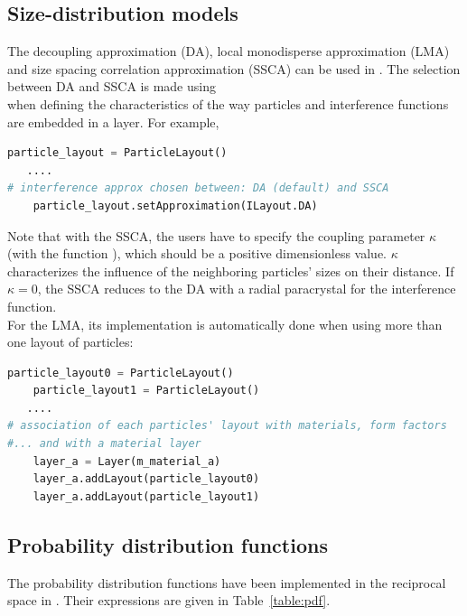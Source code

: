 \subsection{Size-distribution models}
The decoupling approximation (DA), local monodisperse approximation (LMA) and size spacing correlation approximation (SSCA) can be used in \BornAgain.
The selection between DA and SSCA is made using\\ 
 when defining the characteristics of the way particles and interference functions are embedded in a layer.  For example,
\begin{lstlisting}[language=python, style=eclipseboxed,numbers=none,nolol]
    particle_layout = ParticleLayout()
   ....
# interference approx chosen between: DA (default) and SSCA
    particle_layout.setApproximation(ILayout.DA)
\end{lstlisting}

Note that with the SSCA, the users have to specify the coupling parameter $\kappa$ (with the function ), which should be a positive dimensionless value. $\kappa$ characterizes the influence of the neighboring particles' sizes on their distance. If $\kappa=0$, the SSCA reduces to the DA with a radial paracrystal for the interference function.\\

For the LMA, its implementation is automatically done when using more than one layout of particles:
\begin{lstlisting}[language=python, style=eclipseboxed,numbers=none,nolol]
    particle_layout0 = ParticleLayout()
    particle_layout1 = ParticleLayout()
   ....
# association of each particles' layout with materials, form factors
#... and with a material layer
    layer_a = Layer(m_material_a)
    layer_a.addLayout(particle_layout0)
    layer_a.addLayout(particle_layout1)
\end{lstlisting}


\subsection{Probability distribution functions}\label{baftd}

The probability distribution functions have been implemented in the reciprocal space in \BornAgain. Their expressions are given in Table~\ref{table:pdf}.

